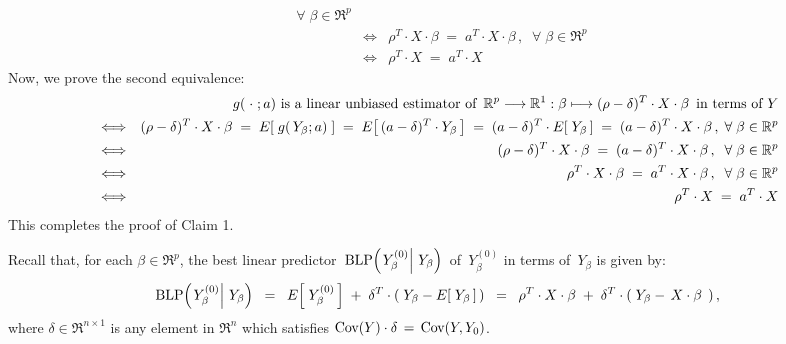 \begin{enumerate}
\begin{eqnarray*}
		\;\; \forall \; \beta \in \Re^{p}
	\\
	&\Longleftrightarrow&
		\rho^{T} \cdot X \cdot \beta
		\; = \;
			a^{T} \cdot X \cdot \beta\,,
		\;\; \forall \; \beta \in \Re^{p}
	\\
	&\Longleftrightarrow&
		\rho^{T} \cdot X \; = \; a^{T} \cdot X
	\end{eqnarray*}
	Now, we prove the second equivalence:
	\begin{eqnarray*}
	&&
		\textnormal{$g(\;\cdot\;;a)$ is a linear unbiased estimator of
		\,$\Re^{p} \longrightarrow \Re^{1} : \beta \longmapsto (\rho - \delta)^{T} \cdot X \cdot \beta$\,
		in terms of $Y$}
	\\
	&\Longleftrightarrow&
		(\rho - \delta)^{T} \cdot X \cdot \beta
		\; = \;
			E\!\left[\;g(\,Y_{\beta};a)\;\right]
		\; = \;
			E\!\left[\,(a - \delta)^{T}\cdot Y_{\beta}\,\right]
		\; = \;
			(a - \delta)^{T} \cdot E\!\left[\;Y_{\beta}\,\right]
		\; = \;
			(a - \delta)^{T} \cdot X \cdot \beta\,,
		\; \forall\;\beta \in \Re^{p}
	\\
	&\Longleftrightarrow&
		(\rho - \delta)^{T} \cdot X \cdot \beta
		\; = \;
			(a - \delta)^{T} \cdot X \cdot \beta\,,
		\;\; \forall\;\beta \in \Re^{p}
	\\
	&\Longleftrightarrow&
		\rho^{T} \cdot X \cdot \beta \; = \; a^{T} \cdot X \cdot \beta\,,
		\;\; \forall\;\beta \in \Re^{p}
	\\
	&\Longleftrightarrow&
		\rho^{T} \cdot X \; = \; a^{T} \cdot X
	\end{eqnarray*}
	This completes the proof of Claim 1.

	\vskip 0.8cm
	\noindent
	Recall that, for each $\beta \in \Re^{p}$, the best linear predictor
	\,$\blp\!\left(\left.Y^{(0)}_{\beta}\right\vert\,Y_{\beta}\right)$\, of
	\,$Y^{(0)}_{\beta}$ in terms of \,$Y_{\beta}$ is given by:
	\begin{equation*}
	\blp\!\left(\left.Y^{(0)}_{\beta}\right\vert\,Y_{\beta}\right)
	\;\; = \;\;
		E\!\left[\;Y^{(0)}_{\beta}\,\right] \; + \; \delta^{T}\cdot(\;Y_{\beta} - E\!\left[\;Y_{\beta}\,\right]\,)
	\;\; = \;\;
		\rho^{T}\cdot X \cdot\beta \; + \; \delta^{T}\cdot(\;Y_{\beta} - \,X\cdot\beta\,\;)\,,
	\end{equation*}
	where $\delta \in \Re^{n \times 1}$ is any element in $\Re^{n}$ which satisfies
	$\Cov(Y) \cdot \delta \,=\, \Cov(Y,Y_{0})$.


\end{enumerate}

